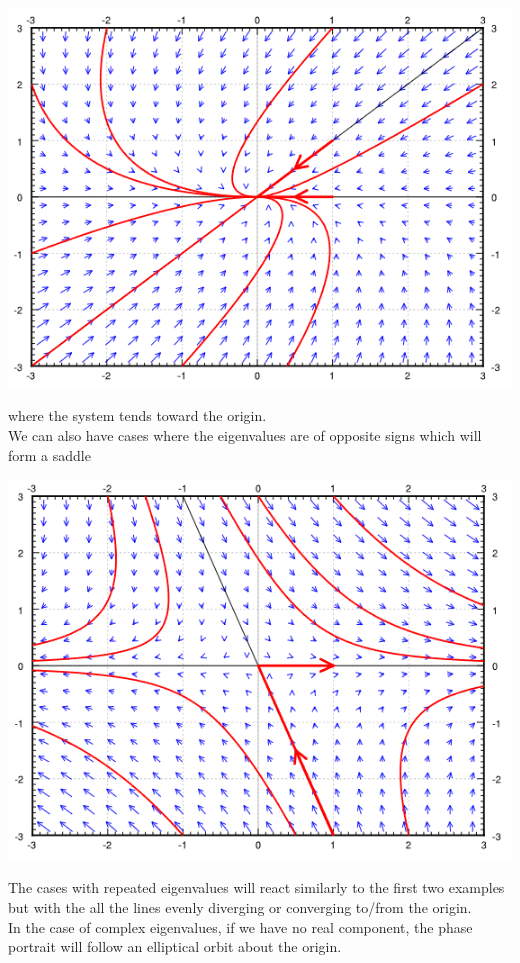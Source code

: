 \centerline{\includegraphics[scale=0.8]{Images/ODEPictures/phasePortrait2.png}}
where the system tends toward the origin.\\
We can also have cases where the eigenvalues are of opposite signs which will form a saddle\\
\centerline{\includegraphics[scale=0.8]{Images/ODEPictures/phasePortrait3.png}}
The cases with repeated eigenvalues will react similarly to the first two examples but with the all the lines evenly diverging or converging to/from the origin.\\
In the case of complex eigenvalues, if we have no real component, the phase portrait will follow an elliptical orbit about the origin.\\
